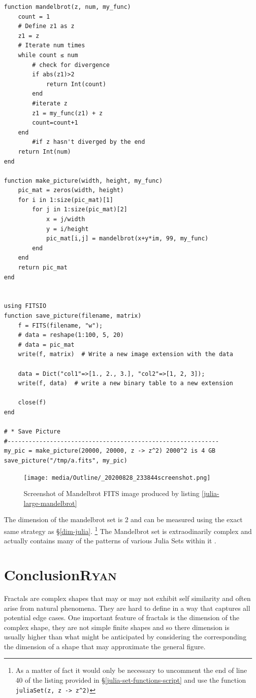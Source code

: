 \documentclass[a4paper,11pt,twoside]{article}
\begin{document}
\begin{verbatim}
function mandelbrot(z, num, my_func)
    count = 1
    # Define z1 as z
    z1 = z
    # Iterate num times
    while count ≤ num
        # check for divergence
        if abs(z1)>2
            return Int(count)
        end
        #iterate z
        z1 = my_func(z1) + z
        count=count+1
    end
        #if z hasn't diverged by the end
    return Int(num)
end

function make_picture(width, height, my_func)
    pic_mat = zeros(width, height)
    for i in 1:size(pic_mat)[1]
        for j in 1:size(pic_mat)[2]
            x = j/width
            y = i/height
            pic_mat[i,j] = mandelbrot(x+y*im, 99, my_func)
        end
    end
    return pic_mat
end


using FITSIO
function save_picture(filename, matrix)
    f = FITS(filename, "w");
    # data = reshape(1:100, 5, 20)
    # data = pic_mat
    write(f, matrix)  # Write a new image extension with the data

    data = Dict("col1"=>[1., 2., 3.], "col2"=>[1, 2, 3]);
    write(f, data)  # write a new binary table to a new extension

    close(f)
end

# * Save Picture
#------------------------------------------------------------
my_pic = make_picture(20000, 20000, z -> z^2) 2000^2 is 4 GB
save_picture("/tmp/a.fits", my_pic)

\end{verbatim}

\begin{figure}[htbp]
\centering
\texttt{[image: media/Outline/\_20200828\_233844screenshot.png]}
\caption{\label{mandelbrot-screen}Screenshot of Mandelbrot FITS image produced by listing \ref{julia-large-mandelbrot}}
\end{figure}


The dimension of the mandelbrot set is 2 \cite{bownScienceMandelbrotSet} and can be measured using the exact same strategy as \S \ref{dim-julia}. \footnote{As a matter of fact it would only be necessary to uncomment the end of line 40 of the listing provided in \S \ref{julia-set-functions-script} and use the function \texttt{juliaSet(z, z -> z\textasciicircum{}2)}} The Mandelbrot set is extraodinarily complex and actually contains many of the patterns of various Julia Sets within it \cite[Ch. 14]{peitgenChaosFractalsNew2004}.
\section{Conclusion\hfill{}\textsc{Ryan}}
\label{sec:org4d9dcb8}
Fractals are complex shapes that may or may not exhibit self similarity and often arise from natural phenomena. They are hard to define in a way that captures all potential edge cases. One important feature of fractals is the dimension of the complex shape, they are not simple finite shapes and so there dimension is usually higher than what might be anticipated by considering the corresponding the dimension of a shape that may approximate the general figure.
\end{document}
